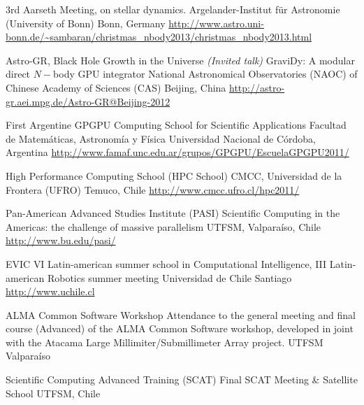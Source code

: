 \documentclass[12pt,a4paper]{moderncv}
\begin{document}
        {3rd Aarseth Meeting, on stellar dynamics.}
        {Argelander-Institut für Astronomie (University of Bonn)}
        {Bonn, Germany}
        {\url{http://www.astro.uni-bonn.de/~sambaran/christmas_nbody2013/christmas_nbody2013.html}}
        {}

        {Astro-GR, Black Hole Growth in the Universe \emph{(Invited talk)}}
        {GraviDy: A modular direct $N-$body GPU integrator}
        {National Astronomical Observatories (NAOC) of Chinese Academy of Sciences
        (CAS)}
        {Beijing, China}
        {\url{http://astro-gr.aei.mpg.de/Astro-GR@Beijing-2012}}

        {First Argentine GPGPU Computing School for Scientific Applications}
        {Facultad de Matemáticas, Astronomía y Física}
        {Universidad Nacional de Córdoba, Argentina}
        {\url{http://www.famaf.unc.edu.ar/grupos/GPGPU/EscuelaGPGPU2011/}}
        {}

        {High Performance Computing School}
        {(HPC School)}
        {CMCC, Universidad de la Frontera (UFRO)}
        {Temuco, Chile}
        {\url{http://www.cmcc.ufro.cl/hpc2011/}}

        {Pan-American Advanced Studies Institute}
        {(PASI)}
        {Scientific Computing in the Americas: the challenge of massive parallelism}
        {UTFSM, Valparaíso, Chile}
        {\url{http://www.bu.edu/pasi/}}

        {EVIC}
        {VI Latin-american summer school in Computational Intelligence, %
         III Latin-american Robotics summer meeting}
        {Universidad de Chile}
        {Santiago}
        {\url{http://www.uchile.cl}}

        {ALMA Common Software Workshop}
        {Attendance to the general meeting and final course (Advanced) of the ALMA
        Common Software workshop, developed in joint with the Atacama Large
        Millimiter/Submillimeter Array project.}
        {UTFSM}
        {Valparaíso}
        {}

        {Scientific Computing Advanced Training}
        {(SCAT)}
        {Final SCAT Meeting \& Satellite School}
        {UTFSM, Chile}
        {}

\renewcommand*{\listitemsymbol}{\hspace{2em}\labelitemi~}
\end{document}

